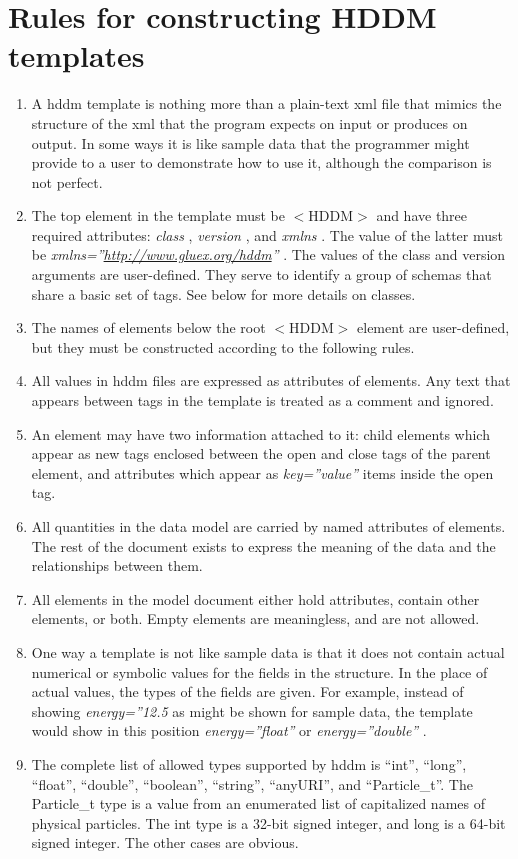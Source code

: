 \documentclass[10pt]{article}
\begin{document}
\section{Rules for constructing HDDM templates}
\begin{enumerate}
\item  A hddm template is nothing more than a plain-text xml file that mimics the structure of the xml that the program expects on input or produces on output. In some ways it is like sample data that the programmer might provide to a user to demonstrate how to use it, although the comparison is not perfect. 
\item  The top element in the template must be $<$HDDM$>$ and have three required attributes: \emph{class}
, \emph{version}
, and \emph{xmlns}
. The value of the latter must be \emph{xmlns=''\url{http://www.gluex.org/hddm}''}
. The values of the class and version arguments are user-defined. They serve to identify a group of schemas that share a basic set of tags. See below for more details on classes. 
\item  The names of elements below the root $<$HDDM$>$ element are user-defined, but they must be constructed according to the following rules. 
\item  All values in hddm files are expressed as attributes of elements. Any text that appears between tags in the template is treated as a comment and ignored. 
\item  An element may have two information attached to it: child elements which appear as new tags enclosed between the open and close tags of the parent element, and attributes which appear as \emph{key=''value''}
 items inside the open tag. 
\item  All quantities in the data model are carried by named attributes of elements. The rest of the document exists to express the meaning of the data and the relationships between them. 
\item  All elements in the model document either hold attributes, contain other elements, or both. Empty elements are meaningless, and are not allowed. 
\item  One way a template is not like sample data is that it does not contain actual numerical or symbolic values for the fields in the structure. In the place of actual values, the types of the fields are given. For example, instead of showing \emph{energy=''12.5}
 as might be shown for sample data, the template would show in this position \emph{energy=''float''}
 or \emph{energy=''double''}
. 
\item  The complete list of allowed types supported by hddm is ``int'', ``long'', ``float'', ``double'', ``boolean'', ``string'', ``anyURI'', and ``Particle\_t''. The Particle\_t type is a value from an enumerated list of capitalized names of physical particles. The int type is a 32-bit signed integer, and long is a 64-bit signed integer. The other cases are obvious. 

\end{enumerate}
\end{document}
